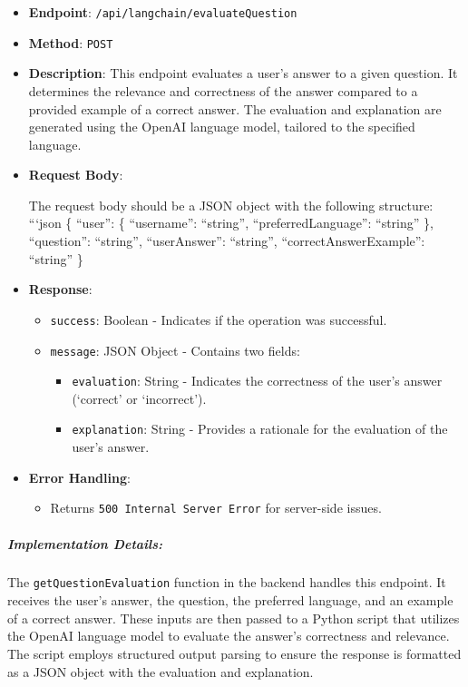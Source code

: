 \begin{itemize}
\item
  \textbf{Endpoint}: \texttt{/api/langchain/evaluateQuestion}
\item
  \textbf{Method}: \texttt{POST}
\item
  \textbf{Description}: This endpoint evaluates a user's answer to a
  given question. It determines the relevance and correctness of the
  answer compared to a provided example of a correct answer. The
  evaluation and explanation are generated using the OpenAI language
  model, tailored to the specified language.
\item
  \textbf{Request Body}:

  The request body should be a JSON object with the following structure:
  ```json \{ ``user'': \{ ``username'': ``string'',
  ``preferredLanguage'': ``string'' \}, ``question'': ``string'',
  ``userAnswer'': ``string'', ``correctAnswerExample'': ``string'' \}
\item
  \textbf{Response}:

  \begin{itemize}
  \tightlist
  \item
    \texttt{success}: Boolean - Indicates if the operation was
    successful.
  \item
    \texttt{message}: JSON Object - Contains two fields:

    \begin{itemize}
    \tightlist
    \item
      \texttt{evaluation}: String - Indicates the correctness of the
      user's answer (`correct' or `incorrect').
    \item
      \texttt{explanation}: String - Provides a rationale for the
      evaluation of the user's answer.
    \end{itemize}
  \end{itemize}
\item
  \textbf{Error Handling}:

  \begin{itemize}
  \tightlist
  \item
    Returns \texttt{500\ Internal\ Server\ Error} for server-side
    issues.
  \end{itemize}
\end{itemize}

\hypertarget{implementation-details-1}{%
\subparagraph{Implementation Details:}\label{implementation-details-1}}

The \texttt{getQuestionEvaluation} function in the backend handles this
endpoint. It receives the user's answer, the question, the preferred
language, and an example of a correct answer. These inputs are then
passed to a Python script that utilizes the OpenAI language model to
evaluate the answer's correctness and relevance. The script employs
structured output parsing to ensure the response is formatted as a JSON
object with the evaluation and explanation.

